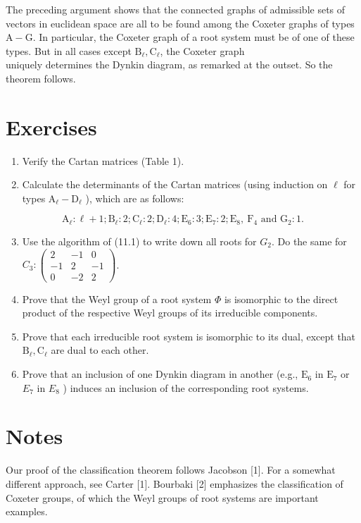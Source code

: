 \documentclass[10pt]{article}
\begin{document}
The preceding argument shows that the connected graphs of admissible sets of vectors in euclidean space are all to be found among the Coxeter graphs of types $\mathrm{A}-\mathrm{G}$. In particular, the Coxeter graph of a root system must be of one of these types. But in all cases except $\mathrm{B}_{\ell}, \mathrm{C}_{\ell}$, the Coxeter graph\\
uniquely determines the Dynkin diagram, as remarked at the outset. So the theorem follows.

\section*{Exercises}
\begin{enumerate}
  \item Verify the Cartan matrices (Table 1).
  \item Calculate the determinants of the Cartan matrices (using induction on $\ell$ for types $\mathrm{A}_{\ell}-\mathrm{D}_{\ell}$ ), which are as follows:
\end{enumerate}

$$
\mathrm{A}_{\ell}: \ell+1 ; \mathrm{B}_{\ell}: 2 ; \mathrm{C}_{\ell}: 2 ; \mathrm{D}_{\ell}: 4 ; \mathrm{E}_{6}: 3 ; \mathrm{E}_{7}: 2 ; \mathrm{E}_{8}, \mathrm{~F}_{4} \text { and } \mathrm{G}_{2}: 1 .
$$

\begin{enumerate}
  \setcounter{enumi}{2}
  \item Use the algorithm of (11.1) to write down all roots for $G_{2}$. Do the same for $C_{3}:\left(\begin{array}{rrr}2 & -1 & 0 \\ -1 & 2 & -1 \\ 0 & -2 & 2\end{array}\right)$.
  \item Prove that the Weyl group of a root system $\Phi$ is isomorphic to the direct product of the respective Weyl groups of its irreducible components.
  \item Prove that each irreducible root system is isomorphic to its dual, except that $\mathrm{B}_{\ell}, \mathrm{C}_{\ell}$ are dual to each other.
  \item Prove that an inclusion of one Dynkin diagram in another (e.g., $\mathrm{E}_{6}$ in $\mathrm{E}_{7}$ or $E_{7}$ in $E_{8}$ ) induces an inclusion of the corresponding root systems.
\end{enumerate}

\section*{Notes}
Our proof of the classification theorem follows Jacobson [1]. For a somewhat different approach, see Carter [1]. Bourbaki [2] emphasizes the classification of Coxeter groups, of which the Weyl groups of root systems are important examples.
\end{document}
